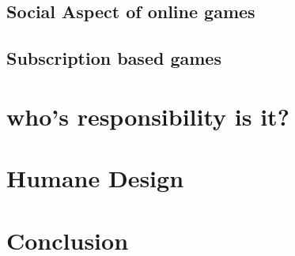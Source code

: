 \documentclass{scrartcl}
\begin{document}
\subsection{Social Aspect of online games}

\subsection{Subscription based games}

\section{who's responsibility is it?}


\section{Humane Design}



\section{Conclusion}


\cite{Ethics1}
\cite{Ethics2}
\cite{Addiction1}
\cite{Addiction2}
\cite{Addiction3}
\cite{Addiction4}
\cite{AddictiveDesign1}
\cite{AddictiveDesign2}
\cite{AddictiveDesign3}
\cite{HumaneDesign}
\cite{FreeToPlay}
\cite{SkinnerBox}
\cite{RatPark1}
\cite{RatPark2}



\end{document}
